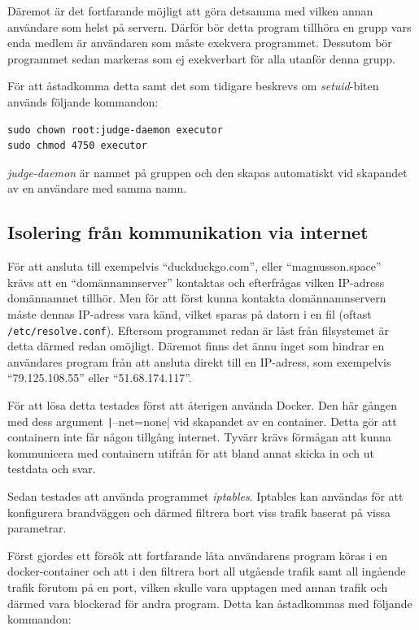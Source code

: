 \documentclass{article}
\begin{document}
Däremot är det fortfarande möjligt att göra detsamma med vilken annan användare
som helst på servern. Därför bör detta program tillhöra en grupp vars enda
medlem är användaren som måste exekvera programmet. Dessutom bör programmet
sedan markeras som ej exekverbart för alla utanför denna grupp.

För att åstadkomma detta samt det som tidigare beskrevs om \textit{setuid}-biten
används följande kommandon:

\begin{verbatim}
sudo chown root:judge-daemon executor
sudo chmod 4750 executor
\end{verbatim}

\textit{judge-daemon} är namnet på gruppen och den skapas automatiskt vid
skapandet av en användare med samma namn.

\subsection{Isolering från kommunikation via internet}

För att ansluta till exempelvis ``duckduckgo.com'', eller ``magnusson.space'' \\
krävs att en ``domännamnserver'' kontaktas och efterfrågas vilken IP-adress
domännamnet tillhör.
Men för att först kunna kontakta domännamnservern måste dennas IP-adress vara
känd, vilket sparas på datorn i en fil (oftast \texttt{/etc/resolve.conf}).
Eftersom programmet redan är låst från filsystemet är detta därmed redan
omöjligt.
Däremot finns det ännu inget som hindrar en användares program från att ansluta
direkt till en IP-adress, som exempelvis ``79.125.108.55'' eller 
``51.68.174.117''.

För att lösa detta testades först att återigen använda Docker. Den här gången
med dess argument \texttt|--net=none| vid skapandet av
en container. Detta gör att containern inte får någon tillgång internet. Tyvärr
krävs förmågan att kunna kommunicera med containern utifrån för att bland annat
skicka in och ut testdata och svar.

Sedan testades att använda programmet \textit{iptables}. Iptables kan användas
för att konfigurera brandväggen och därmed filtrera bort viss trafik baserat på
vissa parametrar.

Först gjordes ett försök att fortfarande låta användarens program köras i en
docker-container och att i den filtrera bort all utgående trafik samt all
ingående trafik förutom på en port, vilken skulle vara upptagen med annan
trafik och därmed vara blockerad för andra program. Detta kan åstadkommas med
följande kommandon:
\end{document}
